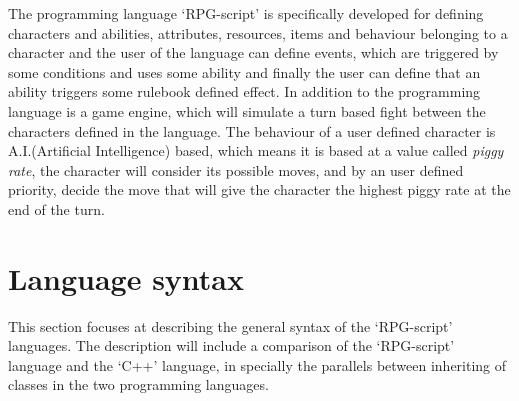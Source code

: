 The programming language `RPG-script' is specifically developed for defining characters and abilities, attributes, resources, items and behaviour belonging to a character and the user of the language can define events, which are triggered by some conditions and uses some ability and finally the user can define that an ability triggers some rulebook defined effect. 
In addition to the programming language is a game engine, which will simulate a turn based fight between the characters defined in the language. 
The behaviour of a user defined character is A.I.(Artificial Intelligence) based, which means it is based at a value called \emph{piggy rate}, the character will consider its possible moves, and by an user defined priority, decide the move that will give the character the highest piggy rate at the end of the turn.

\section{Language syntax}
This section focuses at describing the general syntax of the `RPG-script' languages. The description will include a comparison of the `RPG-script' language and the `C++' language, in specially the parallels between inheriting of classes in the two programming languages. 


